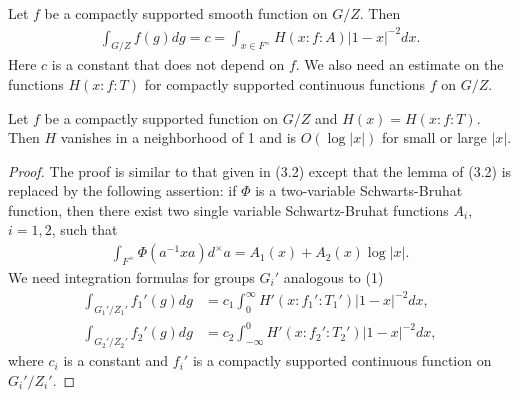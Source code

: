 \subsection{}
Let $f$ be a compactly supported smooth function on $G/Z$.
Then
\begin{align}
\label{4.3.1}
    \int_{G/Z} f(g)dg = c = \int_{x \in F^\times} H(x:f:A)|1 - x|^{-2} dx.
\end{align}
Here $c$ is a constant that does not depend on $f$.
We also need an estimate on the functions $H(x:f:T)$ for compactly supported continuous functions $f$  on $G/Z$.

\begin{lemma}
Let $f$ be a compactly supported function on $G/Z$ and $H(x) = H(x:f:T)$.
Then $H$ vanishes in a neighborhood of 1 and is $O(\log |x|)$ for small or large $|x|$.
\end{lemma}
\begin{proof}
The proof is similar to that given in (3.2) except that the lemma of (3.2) is replaced by the following assertion: if $\Phi$ is a two-variable Schwarts-Bruhat function, then there exist two single variable Schwartz-Bruhat functions $A_i$, $i = 1, 2$, such that
\begin{align*}
    \int_{F^\times} \Phi(a^{-1}x a) d^\times a = A_1(x) + A_2(x) \log |x|.
\end{align*}
We need integration formulas for groups $G_i'$ analogous to (1)
\begin{align}
    \int_{G_1' / Z_1'} f_1'(g) dg &= c_1 \int_{0}^{\infty} H'(x:f_1':T_1') |1 - x|^{-2} dx, \label{4.3.3} \\
    \int_{G_2' / Z_2'} f_2'(g) dg &= c_2 \int_{-\infty}^{0} H'(x:f_2':T_2') |1-x|^{-2} dx, \label{4.3.4}
\end{align}
where $c_i$ is a constant and $f_i'$ is a compactly supported continuous function on $G_i' / Z_i'$.
\end{proof}

